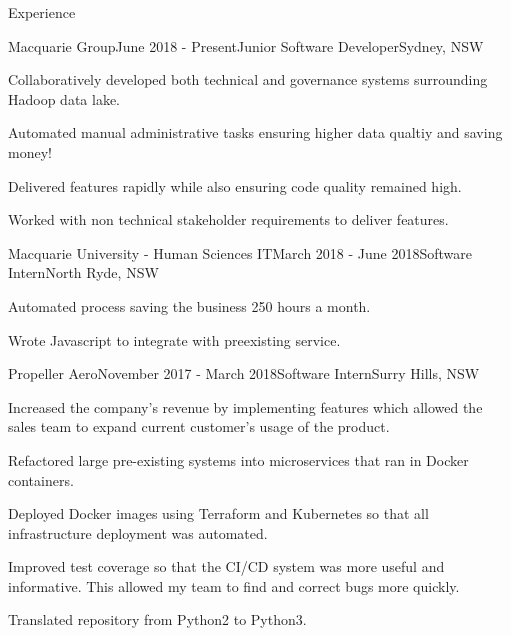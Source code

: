 \documentclass{resume} %
\begin{document}

\begin{rSection}{Experience}


\begin{rSubsection}{Macquarie Group}{June 2018 - Present}{Junior Software Developer}{Sydney, NSW}
\item Collaboratively developed both technical and governance systems surrounding Hadoop data lake.
\item Automated manual administrative tasks ensuring higher data qualtiy and saving money! 
\item Delivered features rapidly while also ensuring code quality remained high.
\item Worked with non technical stakeholder requirements to deliver features.
\end{rSubsection}

\begin{rSubsection}{Macquarie University - Human Sciences IT}{March 2018 - June 2018}{Software Intern}{North Ryde, NSW}
\item Automated process saving the business 250 hours a month.
\item Wrote Javascript to integrate with preexisting service.
\end{rSubsection}

\begin{rSubsection}{Propeller Aero}{November 2017 - March 2018}{Software Intern}{Surry Hills, NSW}
\item Increased the company's revenue by implementing features which allowed the sales team to expand current customer's usage of the product.
\item Refactored large pre-existing systems into microservices that ran in Docker containers. 
\item Deployed Docker images using Terraform and Kubernetes so that all infrastructure deployment was automated.
\item Improved test coverage so that the CI/CD system was more useful and informative. This allowed my team to find and correct bugs more quickly.
\item Translated repository from Python2 to Python3.
\end{rSubsection}

\end{rSection}
\end{document}
